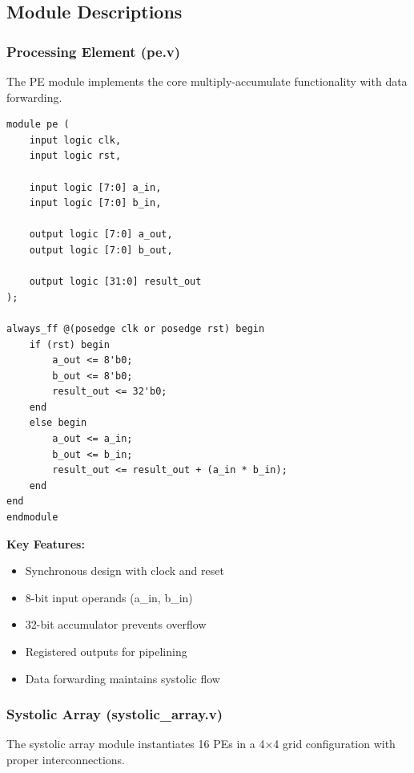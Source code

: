 \documentclass[12pt,a4paper]{article}
\begin{document}
\subsection{Module Descriptions}

\subsubsection{Processing Element (pe.v)}

The PE module implements the core multiply-accumulate functionality with data forwarding.

\begin{lstlisting}[style=verilog,caption={Processing Element Implementation},label={lst:pe}]
module pe (
    input logic clk,
    input logic rst,

    input logic [7:0] a_in,
    input logic [7:0] b_in,

    output logic [7:0] a_out,
    output logic [7:0] b_out,
    
    output logic [31:0] result_out
);
    
always_ff @(posedge clk or posedge rst) begin
    if (rst) begin 
        a_out <= 8'b0;
        b_out <= 8'b0;
        result_out <= 32'b0;
    end 
    else begin
        a_out <= a_in;
        b_out <= b_in;
        result_out <= result_out + (a_in * b_in);
    end
end
endmodule
\end{lstlisting}

\textbf{Key Features:}
\begin{itemize}
    \item Synchronous design with clock and reset
    \item 8-bit input operands (a\_in, b\_in)
    \item 32-bit accumulator prevents overflow
    \item Registered outputs for pipelining
    \item Data forwarding maintains systolic flow
\end{itemize}

\newpage

\subsubsection{Systolic Array (systolic\_array.v)}

The systolic array module instantiates 16 PEs in a 4×4 grid configuration with proper interconnections.
\end{document}
